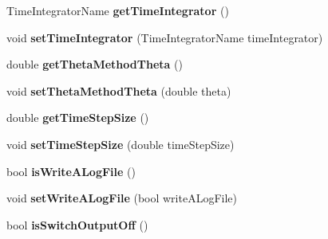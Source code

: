 \begin{DoxyCompactItemize}
\item 
\hypertarget{classnatrium_1_1SolverConfiguration_ac7e6189aaa1b54016993e852999376eb}{Time\-Integrator\-Name {\bfseries get\-Time\-Integrator} ()}\label{classnatrium_1_1SolverConfiguration_ac7e6189aaa1b54016993e852999376eb}

\item 
\hypertarget{classnatrium_1_1SolverConfiguration_ac58399f50e64bc8b0efde5b51e246aeb}{void {\bfseries set\-Time\-Integrator} (Time\-Integrator\-Name time\-Integrator)}\label{classnatrium_1_1SolverConfiguration_ac58399f50e64bc8b0efde5b51e246aeb}

\item 
\hypertarget{classnatrium_1_1SolverConfiguration_a0e2606b5c10964a08e7107dbe079a1ed}{double {\bfseries get\-Theta\-Method\-Theta} ()}\label{classnatrium_1_1SolverConfiguration_a0e2606b5c10964a08e7107dbe079a1ed}

\item 
\hypertarget{classnatrium_1_1SolverConfiguration_acb2153b276dfc0e28bb2cabf8855acd0}{void {\bfseries set\-Theta\-Method\-Theta} (double theta)}\label{classnatrium_1_1SolverConfiguration_acb2153b276dfc0e28bb2cabf8855acd0}

\item 
\hypertarget{classnatrium_1_1SolverConfiguration_ae446f5d60a09f30a43258a5ec2bebbbf}{double {\bfseries get\-Time\-Step\-Size} ()}\label{classnatrium_1_1SolverConfiguration_ae446f5d60a09f30a43258a5ec2bebbbf}

\item 
\hypertarget{classnatrium_1_1SolverConfiguration_aab0d1b737708c92e83ebe3424b3bed4d}{void {\bfseries set\-Time\-Step\-Size} (double time\-Step\-Size)}\label{classnatrium_1_1SolverConfiguration_aab0d1b737708c92e83ebe3424b3bed4d}

\item 
\hypertarget{classnatrium_1_1SolverConfiguration_ac97dc43684f8a690de0f3e9c132dda02}{bool {\bfseries is\-Write\-A\-Log\-File} ()}\label{classnatrium_1_1SolverConfiguration_ac97dc43684f8a690de0f3e9c132dda02}

\item 
\hypertarget{classnatrium_1_1SolverConfiguration_a6e50f8fc372b4346ba9f309d5d5f47b3}{void {\bfseries set\-Write\-A\-Log\-File} (bool write\-A\-Log\-File)}\label{classnatrium_1_1SolverConfiguration_a6e50f8fc372b4346ba9f309d5d5f47b3}

\item 
\hypertarget{classnatrium_1_1SolverConfiguration_ae4852378b026ccc913732eb8b20eca74}{bool {\bfseries is\-Switch\-Output\-Off} ()}\label{classnatrium_1_1SolverConfiguration_ae4852378b026ccc913732eb8b20eca74}


\end{DoxyCompactItemize}
